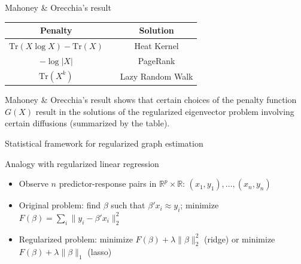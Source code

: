 \documentclass[xcolor=dvipsnames]{beamer}
\begin{document}
\begin{frame}
  \begin{block}{Mahoney \& Orecchia's result}
    \centering
    \begin{tabular}{ccc}
      Penalty &\phantom{MMM} & Solution \\
      \hline
      $\mathrm{Tr}(X \log X) - \mathrm{Tr}(X)$ && Heat Kernel \\
      $- \log |X|$ && PageRank  \\
      $\mathrm{Tr}(X^k)$ && Lazy Random Walk
    \end{tabular}
  \end{block}
  Mahoney \& Orecchia's result shows that certain choices of the penalty
  function $G(X)$ result in the solutions of the regularized eigenvector
  problem involving certain diffusions (summarized by the table).
\end{frame}


\begin{frame}
  \begin{block}{}
  \begin{center}
    \huge{Statistical framework for regularized graph estimation}
  \end{center}
  \end{block}
\end{frame}

\begin{frame}
  \begin{block}{Analogy with regularized linear regression}
  \begin{itemize}
    \item Observe $n$ predictor-response pairs in $\mathbb{R}^p \times \mathbb{R}$:
      $(x_1, y_1), \dotsc, (x_n, y_n)$
    \item Original problem: find $\beta$ such that $\beta' x_i \approx y_i$; minimize $F(\beta) =
    \sum_i \|y_i - \beta' x_i \|_2^2$
    \item Regularized problem: minimize $F(\beta) + \lambda \| \beta \|_2^2$
    (ridge) or minimize $F(\beta) + \lambda \| \beta \|_1$ (lasso)
  \end{itemize}
  \end{block}
\end{frame}
\end{document}
